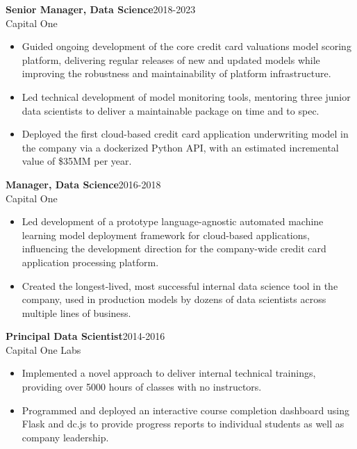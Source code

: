 \documentclass[11pt]{res}
\begin{document}
\begin{resume}
{\bf Senior Manager, Data Science}\hfill\mbox{2018-2023}\\
Capital One
\vspace*{0.01 in}\begin{itemize} \itemsep -2pt
  \item Guided ongoing development of the core credit card valuations model scoring platform, delivering regular releases of new and updated models while improving the robustness and maintainability of platform infrastructure. 
  \item Led technical development of model monitoring tools, mentoring three junior data scientists to deliver a maintainable package on time and to spec.
  \item Deployed the first cloud-based credit card application underwriting model
    in the company via a dockerized Python API, with an estimated
    incremental value of \$35MM per year.
\end{itemize}

{\bf Manager, Data Science}\hfill\mbox{2016-2018}\\
Capital One
\vspace*{0.01 in}\begin{itemize} \itemsep -2pt
  \item Led development of a prototype language-agnostic automated machine learning model
    deployment framework for cloud-based applications, influencing the
    development direction for the company-wide credit card application
    processing platform.
  \item Created the longest-lived, most successful
    internal data science tool in the company, used in production models by dozens of
    data scientists across multiple lines of business.
\end{itemize}

{\bf Principal Data Scientist}\hfill\mbox{2014-2016}\\
Capital One Labs
\vspace*{0.01 in}\begin{itemize} \itemsep -2pt 
  \item Implemented a novel approach to deliver internal technical
    trainings, providing over 5000 hours of classes with no instructors.
  \item Programmed and deployed an interactive course completion dashboard using Flask
    and dc.js to provide progress reports to individual students as
    well as company leadership.
  \end{itemize}


\end{resume}
\end{document}

